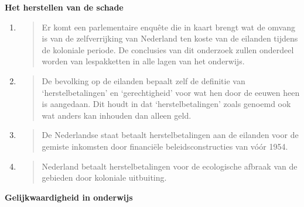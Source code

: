 \textbf{Het herstellen van de schade}

\begin{enumerate}
\def\labelenumi{\arabic{enumi}.}
\item
  \begin{quote}
  Er komt een parlementaire enquête die in kaart brengt wat de omvang is
  van de zelfverrijking van Nederland ten koste van de eilanden tijdens
  de koloniale periode. De conclusies van dit onderzoek zullen onderdeel
  worden van lespakketten in alle lagen van het onderwijs.
  \end{quote}
\item
  \begin{quote}
  De bevolking op de eilanden bepaalt zelf de definitie van
  `herstelbetalingen' en `gerechtigheid' voor wat hen door de eeuwen
  heen is aangedaan. Dit houdt in dat `herstelbetalingen' zoals genoemd
  ook wat anders kan inhouden dan alleen geld.
  \end{quote}
\item
  \begin{quote}
  De Nederlandse staat betaalt herstelbetalingen aan de eilanden voor de
  gemiste inkomsten door financiële beleidsconstructies van vóór 1954.
  \end{quote}
\item
  \begin{quote}
  Nederland betaalt herstelbetalingen voor de ecologische afbraak van de
  gebieden door koloniale uitbuiting.
  \end{quote}
\end{enumerate}

\textbf{Gelijkwaardigheid in onderwijs}

